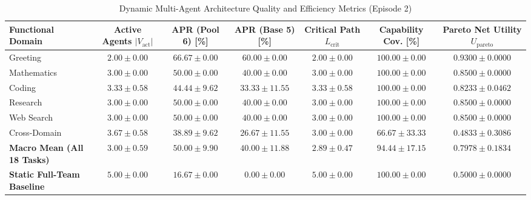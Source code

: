 \begin{table}[!t]
\centering
\caption{Dynamic Multi-Agent Architecture Quality and Efficiency Metrics (Episode 2)}
\label{tab:architecture_metrics}
\footnotesize
\begin{tabular}{lcccccc}
\toprule
\textbf{Functional Domain} & \textbf{Active Agents $|V_{\mathrm{act}}|$} & \textbf{APR (Pool 6) [\%]} & \textbf{APR (Base 5) [\%]} & \textbf{Critical Path $L_{\mathrm{crit}}$} & \textbf{Capability Cov. [\%]} & \textbf{Pareto Net Utility $U_{\mathrm{pareto}}$} \\
\midrule
Greeting & $2.00 \pm 0.00$ & $66.67 \pm 0.00$ & $60.00 \pm 0.00$ & $2.00 \pm 0.00$ & $100.00 \pm 0.00$ & $0.9300 \pm 0.0000$ \\
Mathematics & $3.00 \pm 0.00$ & $50.00 \pm 0.00$ & $40.00 \pm 0.00$ & $3.00 \pm 0.00$ & $100.00 \pm 0.00$ & $0.8500 \pm 0.0000$ \\
Coding & $3.33 \pm 0.58$ & $44.44 \pm 9.62$ & $33.33 \pm 11.55$ & $3.33 \pm 0.58$ & $100.00 \pm 0.00$ & $0.8233 \pm 0.0462$ \\
Research & $3.00 \pm 0.00$ & $50.00 \pm 0.00$ & $40.00 \pm 0.00$ & $3.00 \pm 0.00$ & $100.00 \pm 0.00$ & $0.8500 \pm 0.0000$ \\
Web Search & $3.00 \pm 0.00$ & $50.00 \pm 0.00$ & $40.00 \pm 0.00$ & $3.00 \pm 0.00$ & $100.00 \pm 0.00$ & $0.8500 \pm 0.0000$ \\
Cross-Domain & $3.67 \pm 0.58$ & $38.89 \pm 9.62$ & $26.67 \pm 11.55$ & $3.00 \pm 0.00$ & $66.67 \pm 33.33$ & $0.4833 \pm 0.3086$ \\
\midrule
\textbf{Macro Mean (All 18 Tasks)} & $\mathbf{3.00 \pm 0.59}$ & $\mathbf{50.00 \pm 9.90}$ & $\mathbf{40.00 \pm 11.88}$ & $\mathbf{2.89 \pm 0.47}$ & $\mathbf{94.44 \pm 17.15}$ & $\mathbf{0.7978 \pm 0.1834}$ \\
\textbf{Static Full-Team Baseline} & $5.00 \pm 0.00$ & $16.67 \pm 0.00$ & $0.00 \pm 0.00$ & $5.00 \pm 0.00$ & $100.00 \pm 0.00$ & $0.5000 \pm 0.0000$ \\
\bottomrule
\end{tabular}
\end{table}
